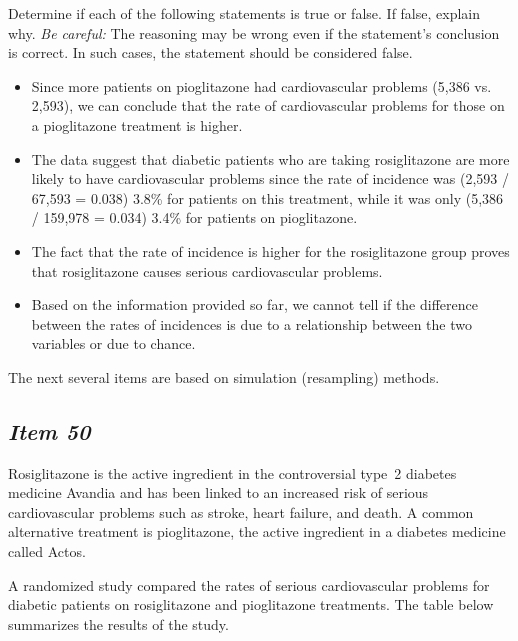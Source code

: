 Determine if each of the following statements is true or false. If false, explain why. \textit{Be careful:} The reasoning may be wrong even if the statement's conclusion is correct. In such cases, the statement should be considered false.


\begin{itemize}


\item Since more patients on pioglitazone had cardiovascular problems (5,386 vs. 2,593), we can conclude that the rate of cardiovascular problems for those on a pioglitazone treatment is higher.


\item The data suggest that diabetic patients who are taking rosiglitazone are more likely to have cardiovascular problems since the rate of incidence was (2,593 / 67,593 = 0.038) 3.8\% for patients on this treatment, while it was only (5,386 / 159,978 = 0.034) 3.4\% for patients on pioglitazone.


\item The fact that the rate of incidence is higher for the rosiglitazone group proves that rosiglitazone causes serious cardiovascular problems.


\item Based on the information provided so far, we cannot tell if the difference between the rates of incidences is due to a relationship between the two variables or due to chance.


\end{itemize}



\vspace{.1in}

The next several items are based on simulation (resampling) methods.

\subsection{\textbf{\textit{Item 50}}} 








Rosiglitazone is the active ingredient in the controversial type~2 diabetes medicine Avandia and has been linked to an increased risk of serious cardiovascular problems such as stroke, heart failure, and death. A common alternative treatment is pioglitazone, the active ingredient in a diabetes medicine called Actos. 


A randomized study compared the rates of serious cardiovascular problems for diabetic patients on rosiglitazone and pioglitazone treatments. The table below summarizes the results of the study.



